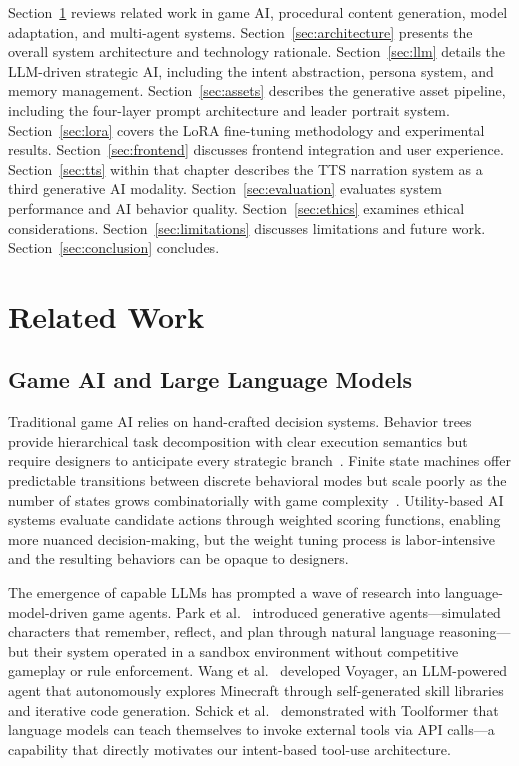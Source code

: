\documentclass[conference]{IEEEtran}
\begin{document}
Section~\ref{sec:related} reviews related work in game AI, procedural
content generation, model adaptation, and multi-agent systems.
Section~\ref{sec:architecture} presents the overall system architecture and
technology rationale. Section~\ref{sec:llm} details the LLM-driven strategic
AI, including the intent abstraction, persona system, and memory
management. Section~\ref{sec:assets} describes the generative asset
pipeline, including the four-layer prompt architecture and leader portrait
system. Section~\ref{sec:lora} covers the LoRA fine-tuning methodology and
experimental results. Section~\ref{sec:frontend} discusses frontend
integration and user experience. Section~\ref{sec:tts} within that
chapter describes the TTS narration system as a third generative AI
modality. Section~\ref{sec:evaluation} evaluates
system performance and AI behavior quality. Section~\ref{sec:ethics}
examines ethical considerations. Section~\ref{sec:limitations} discusses
limitations and future work. Section~\ref{sec:conclusion} concludes.

\FloatBarrier
\section{Related Work}
\label{sec:related}

\subsection{Game AI and Large Language Models}

Traditional game AI relies on hand-crafted decision systems. Behavior trees
provide hierarchical task decomposition with clear execution semantics but
require designers to anticipate every strategic
branch~\cite{simpson2014behaviortrees}. Finite state machines offer
predictable transitions between discrete behavioral modes but scale poorly
as the number of states grows combinatorially with game
complexity~\cite{rabin2013gameaipro}. Utility-based AI systems evaluate
candidate actions through weighted scoring functions, enabling more nuanced
decision-making, but the weight tuning process is labor-intensive and the
resulting behaviors can be opaque to designers.

The emergence of capable LLMs has prompted a wave of research into
language-model-driven game agents. Park et al.~\cite{park2023generative}
introduced generative agents---simulated characters that remember, reflect,
and plan through natural language reasoning---but their system operated in a
sandbox environment without competitive gameplay or rule enforcement.
Wang et al.~\cite{wang2023voyager} developed Voyager, an LLM-powered agent
that autonomously explores Minecraft through self-generated skill libraries
and iterative code generation. Schick et al.~\cite{schick2023toolformer}
demonstrated with Toolformer that language models can teach themselves to
invoke external tools via API calls---a capability that directly motivates
our intent-based tool-use architecture.
\end{document}
